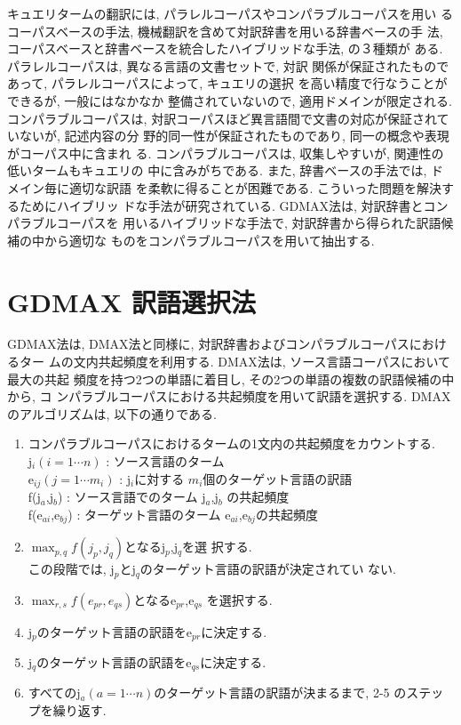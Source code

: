 キュエリタームの翻訳には, パラレルコーパスやコンパラブルコーパスを用い
るコーパスベースの手法, 機械翻訳を含めて対訳辞書を用いる辞書ベースの手
法, コーパスベースと辞書ベースを統合したハイブリッドな手法, の３種類が
ある\cite{hull97}. パラレルコーパスは, 異なる言語の文書セットで, 対訳
関係が保証されたものであって, パラレルコーパスによって, キュエリの選択
を高い精度で行なうことができるが, 一般にはなかなか
整備されていないので, 適用ドメインが限定される. コンパラブルコーパスは, 
対訳コーパスほど異言語間で文書の対応が保証されていないが, 記述内容の分
野的同一性が保証されたものであり, 同一の概念や表現がコーパス中に含まれ
る. コンパラブルコーパスは, 収集しやすいが, 関連性の低いタームもキュエリの
中に含みがちである. また, 辞書ベースの手法では, ドメイン毎に適切な訳語
を柔軟に得ることが困難である. こういった問題を解決するためにハイブリッ
ドな手法が研究されている. GDMAX法は, 対訳辞書とコンパラブルコーパスを
用いるハイブリッドな手法で, 対訳辞書から得られた訳語候補の中から適切な
ものをコンパラブルコーパスを用いて抽出する. 

\section{GDMAX 訳語選択法}

GDMAX法は, DMAX法と同様に, 対訳辞書およびコンパラブルコーパスにおけるター
ムの文内共起頻度を利用する. DMAX法は, ソース言語コーパスにおいて最大の共起
頻度を持つ2つの単語に着目し, その2つの単語の複数の訳語候補の中から, コ
ンパラブルコーパスにおける共起頻度を用いて訳語を選択する. 
DMAXのアルゴリズムは, 以下の通りである\cite{doi93}. 

\begin{enumerate}  \setlength{\itemsep}{-1mm}
\item コンパラブルコーパスにおけるタームの1文内の共起頻度をカウントする. \\
{j}$_{i}(i=1\cdots n)$
 : ソース言語のターム\\
{e}$_{ij}(j=1\cdots m_{i})$ 
 : {j}$_{i}$に対する $m_{i}$個のターゲット言語の訳語 \\
{f}({j}$_{a}$,{j}$_{b}$) 
 : ソース言語でのターム {j}$_{a}$,{j}$_{b}$ の共起頻度 \\
{f}({e}$_{ai}$,{e}$_{bj}$) 
 : ターゲット言語のターム {e}$_{ai}$,{e}$_{bj}$の共起頻度
\item  $\max_{p,q}{f}({j}_{p},{j}_{q})$となる{j}$_{p}$,{j}$_{q}$を選
択する. \\ 
この段階では, {j}$_{p}$と{j}$_{q}$のターゲット言語の訳語が決定されてい
ない. 
\item $\max_{r,s}{f}({e}_{pr},{e}_{qs})$となる{e}$_{pr}$,{e}$_{qs}$
を選択する. 
\item {j}$_{p}$のターゲット言語の訳語を{e}$_{pr}$に決定する. 
\item {j}$_{q}$のターゲット言語の訳語を{e}$_{qs}$に決定する. 
\item すべての{j}$_{a}(a=1\cdots n)$のターゲット言語の訳語が決まるまで, 2-5
のステップを繰り返す. 
\end{enumerate}

